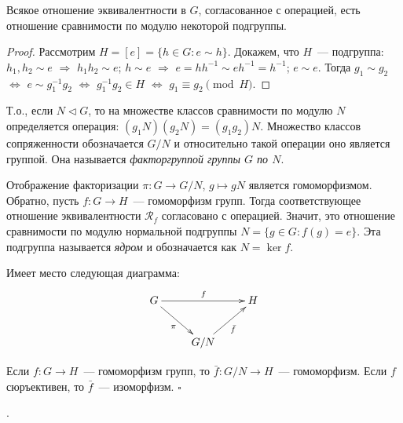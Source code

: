 \documentclass[a4paper]{article}
\renewcommand{\Im}{\mathop{\mathrm{Im}}\nolimits}
\begin{document}
\begin{theorem}
Всякое отношение эквивалентности в $G$, согласованное с операцией,
есть отношение сравнимости по модулю некоторой подгруппы.
\end{theorem}

\begin{proof}
Рассмотрим $H=[e]=\{h\in G: e\sim h\}$. Докажем, что $H$~---
подгруппа: $h_1,h_2\sim e$ $\Rightarrow$ $h_1h_2\sim e$; $h\sim e$
$\Rightarrow$ $e=hh^{-1}\sim e h^{-1}=h^{-1}$; $e\sim e$. Тогда
$g_1\sim g_2$ $\Leftrightarrow$ $e\sim g_1^{-1}g_2$
$\Leftrightarrow$ $g_1^{-1}g_2\in H$ $\Leftrightarrow$ $g_1\equiv
g_2\pmod{H}$.
\end{proof}

Т.о., если $N\triangleleft G$, то на множестве классов сравнимости
по модулю $N$ определяется операция: $(g_1N)(g_2N)=(g_1g_2)N$.
Множество классов сопряженности обозначается $G/N$  и относительно
такой операции оно является группой. Она называется
\emph{факторгруппой группы $G$ по $N$}.

Отображение факторизации $\pi\colon G\to G/N$, $g\mapsto gN$
является гомоморфизмом. Обратно, пусть $f\colon G\to H$~---
гомоморфизм групп. Тогда соответствующее отношение эквивалентности
$\mathcal{R}_f$ согласовано с операцией. Значит, это отношение
сравнимости по модулю нормальной подгруппы $N=\{g\in G: f(g)=e\}$.
Эта подгруппа называется \emph{ядром} и обозначается как $N=\ker f$.

Имеет место следующая диаграмма:
$$\xymatrix{
 G \ar[rr]^f \ar[dr]_\pi && H\\
&G/N \ar[ur]_{\bar{f}} }$$

\begin{theorem}
Если $f\colon G\to H$~--- гомоморфизм групп, то $\bar{f}\colon
G/N\to H$~--- гомоморфизм. Если $f$ сюръективен, то $\bar{f}$~---
изоморфизм. $\square$
\end{theorem}

\note{В общем случае $G/\ker f\simeq \Im f$}.
\end{document}
